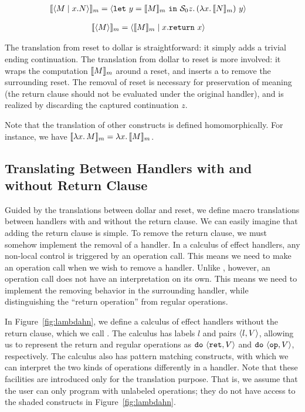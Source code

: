\begin{align*}
\llbracket \langle M \mid x.N \rangle \rrbracket_m &=
\langle \texttt{let} \ y = \llbracket M \rrbracket_m \ \texttt{in} \ \mathcal{S}_0 z.\, (\lambda x.\, \llbracket N \rrbracket_m) \ y \rangle
\end{align*}

\begin{align*}
\llbracket \langle M \rangle \rrbracket_m &= \langle \llbracket M \rrbracket_m \mid x.\texttt{return} \ x \rangle
\end{align*}

\noindent The translation from reset to dollar is straightforward: it
simply adds a trivial ending continuation.
The translation from dollar to reset is more involved: it wraps the
computation $\llbracket M \rrbracket_m$ around a reset, and inserts a \shiftztt to
remove the surrounding reset.
The removal of reset is necessary for preservation of meaning (the return
clause should not be evaluated under the original handler), and is realized
by discarding the captured continuation $z$.

Note that the translation of other constructs is defined homomorphically.
For instance, we have $\llbracket \lambda x.\, M \rrbracket_m = \lambda x.\, \llbracket M \rrbracket_m$.


\subsection{Translating Between Handlers with and without Return Clause}
\label{sec:return:handler}

\Lambdahn

Guided by the translations between dollar and reset, we define macro
translations between handlers with and without the return clause.
We can easily imagine that adding the return clause is simple.
To remove the return clause, we must somehow implement the removal of a
handler.
In a calculus of effect handlers, any non-local control is triggered by an
operation call.
This means we need to make an operation call when we wish to remove a
handler.
Unlike \shiftztt, however, an operation call does not have an interpretation
on its own.
This means we need to implement the removing behavior in the surrounding
handler, while distinguishing the ``return operation'' from regular
operations.

In Figure~\ref{fig:lambdahn}, we define a calculus of effect handlers
without the return clause, which we call \lambdahn.
The calculus has labels $l$ and pairs $\langle l, V \rangle$, allowing us to represent
the return and regular operations as $\texttt{do} \ \langle \texttt{ret}, V \rangle$ and $\texttt{do} \ \langle \texttt{op}, V \rangle$,
respectively.
The calculus also has pattern matching constructs, with which we can interpret
the two kinds of operations differently in a handler.
Note that these facilities are introduced only for the translation purpose.
That is, we assume that the user can only program with unlabeled operations;
they do not have access to the shaded constructs in Figure~\ref{fig:lambdahn}.


